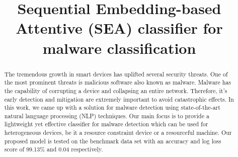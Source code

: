 \documentclass[conference]{IEEEtran}
\begin{document}
\IEEEoverridecommandlockouts
{}
\title{Sequential Embedding-based Attentive (SEA) classifier for malware classification\\
}
\IEEEpubidadjcol

\author{
\and
{}
\and
{}
\and
{}

}

\maketitle

\begin{abstract}
The tremendous growth in smart devices has
uplifted several security threats. One of the most prominent
threats is malicious software also known as malware. Malware
has the capability of corrupting a device and collapsing an entire
network. Therefore, it’s early detection and mitigation are extremely important to avoid catastrophic effects. In this work, we
came up with a solution for malware detection using state-of-the-art natural language processing (NLP) techniques. Our
main focus is to provide a lightweight yet effective classifier for
malware detection which can be used for heterogeneous devices,
be it a resource constraint device or a resourceful machine. Our
proposed model is tested on the benchmark data set with an
accuracy and log loss score of 99.13\% and 0.04 respectively. 
\end{abstract}
\end{document}
